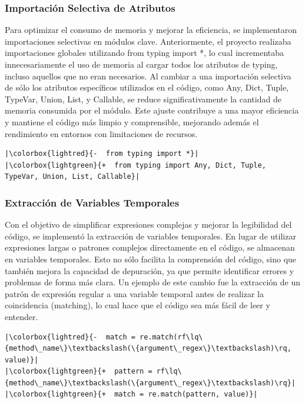 \subsubsection{Importación Selectiva de Atributos}
Para optimizar el consumo de memoria y mejorar la eficiencia, se implementaron importaciones selectivas en módulos clave. Anteriormente, el proyecto realizaba importaciones globales utilizando from typing import *, lo cual incrementaba innecesariamente el uso de memoria al cargar todos los atributos de typing, incluso aquellos que no eran necesarios. Al cambiar a una importación selectiva de sólo los atributos específicos utilizados en el código, como Any, Dict, Tuple, TypeVar, Union, List, y Callable, se reduce significativamente la cantidad de memoria consumida por el módulo. Este ajuste contribuye a una mayor eficiencia y mantiene el código más limpio y comprensible, mejorando además el rendimiento en entornos con limitaciones de recursos.
\begin{verbatim}
|\colorbox{lightred}{-  from typing import *}|
|\colorbox{lightgreen}{+  from typing import Any, Dict, Tuple, TypeVar, Union, List, Callable}|
\end{verbatim}

\subsubsection{Extracción de Variables Temporales}
Con el objetivo de simplificar expresiones complejas y mejorar la legibilidad del código, se implementó la extracción de variables temporales. En lugar de utilizar expresiones largas o patrones complejos directamente en el código, se almacenan en variables temporales. Esto no sólo facilita la comprensión del código, sino que también mejora la capacidad de depuración, ya que permite identificar errores y problemas de forma más clara. Un ejemplo de este cambio fue la extracción de un patrón de expresión regular a una variable temporal antes de realizar la coincidencia (matching), lo cual hace que el código sea más fácil de leer y entender.
\begin{verbatim}
|\colorbox{lightred}{-  match = re.match(rf\lq\{method\_name\}\textbackslash(\{argument\_regex\}\textbackslash)\rq, value)}|
|\colorbox{lightgreen}{+  pattern = rf\lq\{method\_name\}\textbackslash(\{argument\_regex\}\textbackslash)\rq}|
|\colorbox{lightgreen}{+  match = re.match(pattern, value)}|
\end{verbatim}

